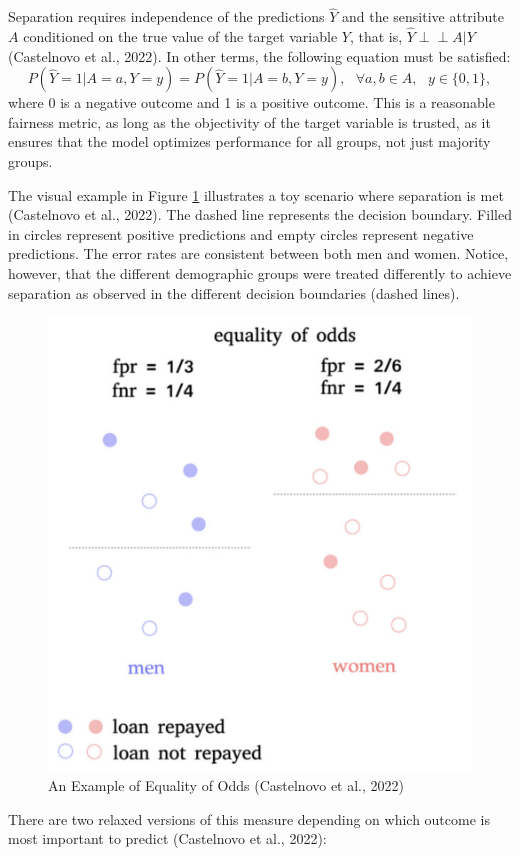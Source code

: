 \documentclass[12pt, twoside]{amherstthesis}
\begin{document}
Separation requires independence of the predictions \(\hat{Y}\) and the sensitive attribute \(A\) conditioned on the true value of the target variable \(Y\), that is, \(\hat{Y} \perp \!\!\! \perp A|Y\) (Castelnovo et al., 2022). In other terms, the following equation must be satisfied:
\begin{equation}
\label{ch1eq8}
P(\hat{Y} = 1 | A = a, Y = y) = P(\hat{Y} = 1 | A = b, Y = y), \text{ } \forall a,b \in A, \text{ } y \in \{ 0, 1 \},
\end{equation}
where 0 is a negative outcome and 1 is a positive outcome. This is a reasonable fairness metric, as long as the objectivity of the target variable is trusted, as it ensures that the model optimizes performance for all groups, not just majority groups.

The visual example in Figure \ref{fig:eoo} illustrates a toy scenario where separation is met (Castelnovo et al., 2022). The dashed line represents the decision boundary. Filled in circles represent positive predictions and empty circles represent negative predictions. The error rates are consistent between both men and women. Notice, however, that the different demographic groups were treated differently to achieve separation as observed in the different decision boundaries (dashed lines).
\begin{figure}

{\centering \includegraphics[width=0.6\linewidth]{figures/eoo} 

}

\caption[An Example of Equality of Odds]{An Example of Equality of Odds (Castelnovo et al., 2022)}\label{fig:eoo}
\end{figure}
There are two relaxed versions of this measure depending on which outcome is most important to predict (Castelnovo et al., 2022):
\end{document}
